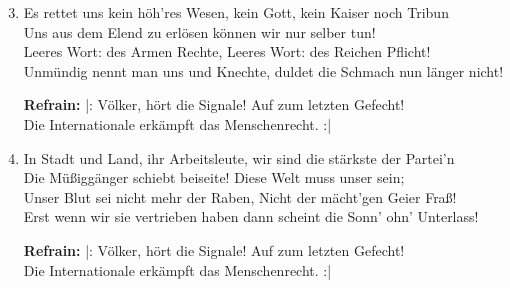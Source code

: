 \begin{guitarMagic}
    \begin{enumerate}
        \setcounter{enumi}{2} %
        \liedweiter

        \item Es rettet uns kein höh’res Wesen, 
        kein Gott, kein Kaiser noch Tribun \\
        Uns aus dem Elend zu erlösen 
        können wir nur selber tun! \\
        Leeres Wort: des Armen Rechte, 
        Leeres Wort: des Reichen Pflicht! \\
        Unmündig nennt man uns und Knechte, 
        duldet die Schmach nun länger nicht! 

        \textbf{Refrain:}
        |: Völker, hört die Signale!
        Auf zum letzten Gefecht! \\
        Die Internationale
        erkämpft das Menschenrecht. :|


        \item In Stadt und Land, ihr Arbeitsleute,
        wir sind die stärkste der Partei’n \\
        Die Müßiggänger schiebt beiseite! 
        Diese Welt muss unser sein; \\
        Unser Blut sei nicht mehr der Raben, 
        Nicht der mächt’gen Geier Fraß! \\
        Erst wenn wir sie vertrieben haben 
        dann scheint die Sonn’ ohn’ Unterlass!

        \textbf{Refrain:}
        |: Völker, hört die Signale!
        Auf zum letzten Gefecht! \\
        Die Internationale
        erkämpft das Menschenrecht. :| 

    \end{enumerate}
\end{guitarMagic}


